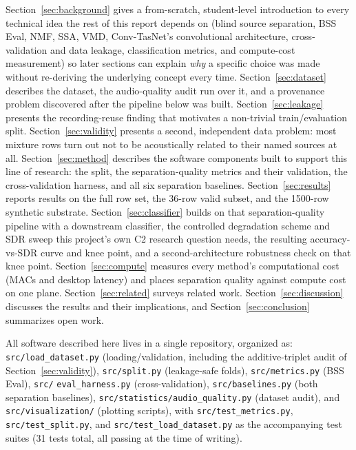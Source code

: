 \documentclass[11pt]{article}
\begin{document}
Section~\ref{sec:background} gives a from-scratch, student-level
introduction to every technical idea the rest of this report depends on
(blind source separation, BSS Eval, NMF, SSA, VMD, Conv-TasNet's
convolutional architecture, cross-validation and data leakage,
classification metrics, and compute-cost measurement) so later sections
can explain \emph{why} a specific choice was made without re-deriving the
underlying concept every time. Section~\ref{sec:dataset} describes the
dataset, the audio-quality audit run over it, and a provenance problem
discovered after the pipeline below was built. Section~\ref{sec:leakage}
presents the recording-reuse finding that motivates a non-trivial
train/evaluation split. Section~\ref{sec:validity} presents a second,
independent data problem: most mixture rows turn out not to be
acoustically related to their named sources at all.
Section~\ref{sec:method} describes the software components built to
support this line of research: the split, the separation-quality metrics
and their validation, the cross-validation harness, and all six separation
baselines. Section~\ref{sec:results} reports results on the full row set,
the 36-row valid subset, and the 1500-row synthetic substrate.
Section~\ref{sec:classifier} builds on that separation-quality pipeline
with a downstream classifier, the controlled degradation scheme and SDR
sweep this project's own C2 research question needs, the resulting
accuracy-vs-SDR curve and knee point, and a second-architecture robustness
check on that knee point. Section~\ref{sec:compute} measures every
method's computational cost (MACs and desktop latency) and places
separation quality against compute cost on one plane.
Section~\ref{sec:related} surveys related work. Section~\ref{sec:discussion}
discusses the results and their implications, and
Section~\ref{sec:conclusion} summarizes open work.

All software described here lives in a single repository, organized as:
\texttt{src/load\_dataset.py} (loading/validation, including the
additive-triplet audit of Section~\ref{sec:validity}), \texttt{src/split.py}
(leakage-safe folds), \texttt{src/metrics.py} (BSS Eval), \texttt{src/}
\texttt{eval\_harness.py} (cross-validation), \texttt{src/baselines.py}
(both separation baselines), \texttt{src/statistics/audio\_quality.py}
(dataset audit), and \texttt{src/visualization/} (plotting scripts), with
\texttt{src/test\_metrics.py}, \texttt{src/test\_split.py}, and
\texttt{src/test\_load\_dataset.py} as the accompanying test suites (31
tests total, all passing at the time of writing).
\end{document}

